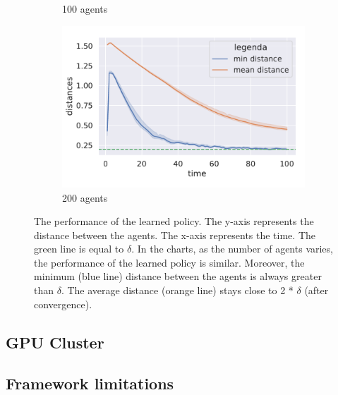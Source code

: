 \documentclass[12pt,a4paper,openright,twoside]{book}
\begin{document}
\begin{figure}[h!]
\begin{subfigure}[b]{0.32\textwidth}
            \caption{100 agents}
        \end{subfigure}
        \hfill
        \begin{subfigure}[b]{0.32\textwidth}
            \centering
            \includegraphics[width=\textwidth]{figures/data-200.pdf}
            \caption{200 agents}
        \end{subfigure}
    \caption{The performance of the learned policy. 
    The y-axis represents the distance between the agents.
    The x-axis represents the time.
    The green line is equal to $\delta$.
    In the charts, as the number of agents varies, the performance of the learned policy is similar.
    Moreover, the minimum (blue line) distance between the agents is always greater than $\delta$.
    The average distance (orange line) stays close to 2 * $\delta$ (after convergence).
    }
    \label{fig:test}
    \end{figure}

\section{GPU Cluster}

\section{Framework limitations}

\chapter{\conclusionsname}
\label{chap:conclusions}





\end{document}
